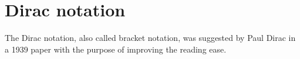 \chapter{Dirac notation}
The Dirac notation, also called bracket notation, was suggested by Paul Dirac in a 1939 paper with the purpose of improving the reading ease. \cite{dirac_1939}